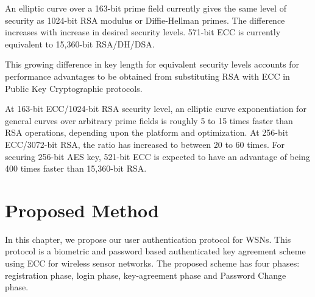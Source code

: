 \documentclass[a4paper,12pt]{report}
\begin{document}
\begin{table}[h]
\caption{Table showing key sizes for equivalent security
levels.\cite{eccadv}} \centering {}
\end{table}
An elliptic curve over a 163-bit prime field currently gives the
same level of security as 1024-bit RSA modulus or Diffie-Hellman
primes. The difference increases with increase in desired security
levels. 571-bit ECC is currently equivalent to 15,360-bit
RSA/DH/DSA.

This growing difference in key length for equivalent security levels
accounts for performance advantages to be obtained from substituting
RSA with ECC in Public Key Cryptographic protocols.


At 163-bit ECC/1024-bit RSA security level, an elliptic curve
exponentiation for general curves over arbitrary prime fields is
roughly 5 to 15 times faster than RSA operations, depending upon the
platform and optimization. At 256-bit ECC/3072-bit RSA, the ratio
has increased to between 20 to 60 times. For securing 256-bit AES
key, 521-bit ECC is expected to have an advantage of being 400 times
faster than 15,360-bit RSA.

\begin{table}[h]
\caption{Sample Elliptic curve exponentiation and RSA
timings(\textit{in milliseconds}).\cite{eccadv}}
\centering
{}
\end{table}

\afterpage{\null\newpage}




\chapter{Proposed Method}
\label{Ch4} In this chapter, we propose our user authentication
protocol for WSNs. This protocol is a biometric and password based
authenticated key agreement scheme using ECC for wireless sensor
networks. The proposed scheme has four phases: registration phase,
login phase, key-agreement phase and Password Change phase.
\end{document}
